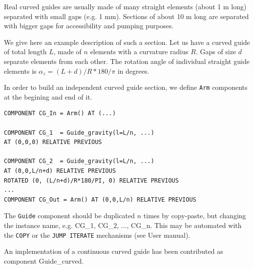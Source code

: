 Real curved guides are usually made of many straight elements (about 1 m long) separated with small gaps (e.g. 1 mm). Sections of about 10 m long are separated with bigger gaps for accessibility and pumping purposes.

We give here an example description of such a section. Let us have a curved guide of total length $L$, made of $n$ elements with a curvature radius $R$. Gaps of size $d$ separate elements from each other. The rotation angle of individual straight guide elements is $\alpha_z = (L+d)/R*180/\pi$ in degrees.

In order to build an independent curved guide section, we define \verb+Arm+ components at the begining and end of it.
\begin{verbatim}
COMPONENT CG_In = Arm() AT (...)

COMPONENT CG_1  = Guide_gravity(l=L/n, ...)
AT (0,0,0) RELATIVE PREVIOUS

COMPONENT CG_2  = Guide_gravity(l=L/n, ...)
AT (0,0,L/n+d) RELATIVE PREVIOUS
ROTATED (0, (L/n+d)/R*180/PI, 0) RELATIVE PREVIOUS
...
COMPONENT CG_Out = Arm() AT (0,0,L/n) RELATIVE PREVIOUS
\end{verbatim}
The \verb+Guide+ component should be duplicated $n$ times by copy-paste, but changing the instance name, e.g. CG\_1, CG\_2, ..., CG\_n. This may be automated with the \verb+COPY+ or the \verb+JUMP ITERATE+ mechanisms (see User manual).

An implementation of a continuous curved guide has been contributed as component Guide\_curved.

